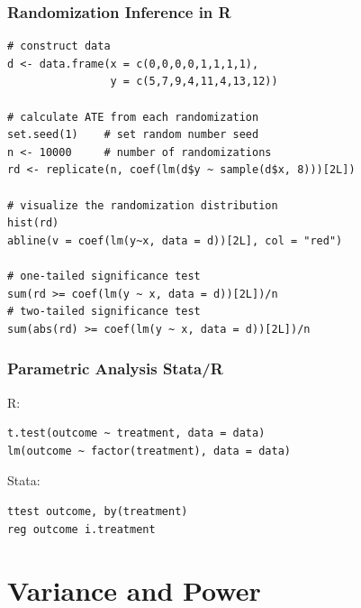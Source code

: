 \documentclass[14pt]{beamer} %
\begin{document}
\begin{frame}[fragile]

\frametitle{Randomization Inference in R}

\footnotesize

\begin{verbatim}
# construct data
d <- data.frame(x = c(0,0,0,0,1,1,1,1), 
                y = c(5,7,9,4,11,4,13,12))

# calculate ATE from each randomization
set.seed(1)    # set random number seed
n <- 10000     # number of randomizations
rd <- replicate(n, coef(lm(d$y ~ sample(d$x, 8)))[2L])

# visualize the randomization distribution
hist(rd)
abline(v = coef(lm(y~x, data = d))[2L], col = "red")

# one-tailed significance test
sum(rd >= coef(lm(y ~ x, data = d))[2L])/n
# two-tailed significance test
sum(abs(rd) >= coef(lm(y ~ x, data = d))[2L])/n
\end{verbatim}

\end{frame}


\begin{frame}[fragile]

\frametitle{Parametric Analysis Stata/R}

R:\small
\begin{verbatim}
t.test(outcome ~ treatment, data = data)
lm(outcome ~ factor(treatment), data = data)
\end{verbatim}

\vspace{1em}

Stata:\small
\begin{verbatim}
ttest outcome, by(treatment)
reg outcome i.treatment
\end{verbatim}

\end{frame}





\section{Variance and Power}
\frame{\tableofcontents[currentsection]}


\end{document}
